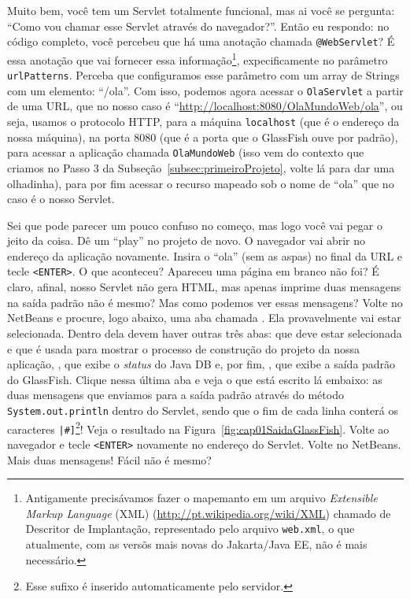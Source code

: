 Muito bem, você tem um Servlet totalmente funcional, mas ai você se pergunta: ``Como vou chamar esse Servlet através do navegador?''. Então eu respondo: no código completo, você percebeu que há uma anotação chamada \texttt{@WebServlet}? É essa anotação que vai fornecer essa informação\footnote{Antigamente precisávamos fazer o mapemanto em um arquivo \textit{Extensible Markup Language} (XML) (\url{http://pt.wikipedia.org/wiki/XML}) chamado de Descritor de Implantação, representado pelo arquivo \texttt{web.xml}, o que atualmente, com as versõs mais novas do Jakarta/Java EE, não é mais necessário.}, expecificamente no parâmetro \texttt{urlPatterns}. Perceba que configuramos esse parâmetro com um array de Strings com um elemento: ``/ola''. Com isso, podemos agora acessar o \texttt{OlaServlet} a partir de uma URL, que no nosso caso é ``\url{http://localhost:8080/OlaMundoWeb/ola}'', ou seja, usamos o protocolo HTTP, para a máquina \texttt{localhost} (que é o endereço da nossa máquina), na porta 8080 (que é a porta que o GlassFish ouve por padrão), para acessar a aplicação chamada \texttt{OlaMundoWeb} (isso vem do contexto que criamos no Passo 3 da Subseção~\ref{subsec:primeiroProjeto}, volte lá para dar uma olhadinha), para por fim acessar o recurso mapeado sob o nome de ``ola'' que no caso é o nosso Servlet. 

Sei que pode parecer um pouco confuso no começo, mas logo você vai pegar o jeito da coisa. Dê um ``play'' no projeto de novo. O navegador vai abrir no endereço da aplicação novamente. Insira o ``ola'' (sem as aspas) no final da URL e tecle \texttt{<ENTER>}. O que aconteceu? Apareceu uma página em branco não foi? É claro, afinal, nosso Servlet não gera HTML, mas apenas imprime duas mensagens na saída padrão não é mesmo? Mas como podemos ver essas mensagens? Volte no NetBeans e procure, logo abaixo, uma aba chamada . Ela provavelmente vai estar selecionada. Dentro dela devem haver outras três abas:  que deve estar selecionada e que é usada para mostrar o processo de construção do projeto da nossa aplicação, , que exibe o \textit{status} do Java DB e, por fim, , que exibe a saída padrão do GlassFish. Clique nessa última aba e veja o que está escrito lá embaixo: as duas mensagens que enviamos para a saída padrão através do método \texttt{System.out.println} dentro do Servlet, sendo que o fim de cada linha conterá os caracteres \texttt{|\#]}\footnote{Esse sufixo é inserido automaticamente pelo servidor.}! Veja o resultado na Figura~\ref{fig:cap01SaidaGlassFish}. Volte ao navegador e tecle \texttt{<ENTER>} novamente no endereço do Servlet. Volte no NetBeans. Mais duas mensagens! Fácil não é mesmo?

